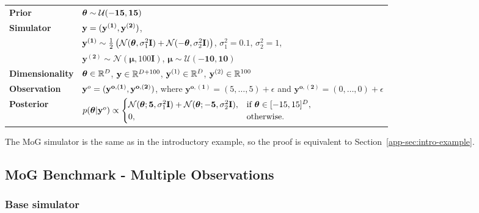 \begin{tabular}{@{}ll@{}}
  \textbf{Prior} & $\boldsymbol{\theta} \sim \mathcal{U}(-\mathbf{15}, \mathbf{15})$ \\ [5pt]
  \textbf{Simulator} & $\mathbf{y}=(\mathbf{y^{(1)}}, \mathbf{y^{(2)}})$,\\[5pt]
  &$\mathbf{y^{(1)}} \sim \frac{1}{2} \left ( \mathcal{N}(\boldsymbol{\theta}, \sigma_1^2 \mathbf{I}) + \mathcal{N}(-\boldsymbol{\theta}, \sigma_2^2 \mathbf{I}) \right )$, $\sigma_1^2=0.1$, $\sigma_2^2=1$,\\[5pt]
  &$\mathbf{y^{(2)}} \sim \mathcal{N}(\boldsymbol{\mu}, 100 \mathbf{I})$, $\boldsymbol{\mu} \sim \mathcal{U}(\mathbf{-10}, \mathbf{10})$ \\ [5pt]
  \textbf{Dimensionality} & $\boldsymbol{\theta} \in \mathbb{R}^{D}$, $\mathbf{y} \in \mathbb{R}^{D + 100}$, $\mathbf{y}^{(1)} \in \mathbb{R}^{D}$, $\mathbf{y}^{(2)} \in \mathbb{R}^{100}$ \\ [5pt]
  \textbf{Observation} & $\mathbf{y}^o = (\mathbf{y^{o, (1)}}, \mathbf{y^{o, (2)}})$, where $\mathbf{y^{o, (1)}} = (5, \ldots, 5) + \epsilon$ and $\mathbf{y^{o, (2)}} = (0, \ldots, 0) + \epsilon$ \\ [5pt]
  \textbf{Posterior} & $ p(\boldsymbol{\theta} | \mathbf{y}^o) \propto
                                    \begin{cases}
                                      \mathcal{N}(\boldsymbol{\theta}; \mathbf{5}, \sigma_1^2 \mathbf{I}) + \mathcal{N}(\boldsymbol{\theta}; -\mathbf{5}, \sigma_2^2 \mathbf{I}), & \text{if } \boldsymbol{\theta} \in [-15, 15]^D, \\
                                      0, & \text{otherwise}.
                                    \end{cases} $ \\ [5pt]
\end{tabular}

The MoG simulator is the same as in the introductory example, so the proof is equivalent to Section~\ref{app-sec:intro-example}.

\subsection{MoG Benchmark - Multiple Observations}

\subsubsection{Base simulator}

